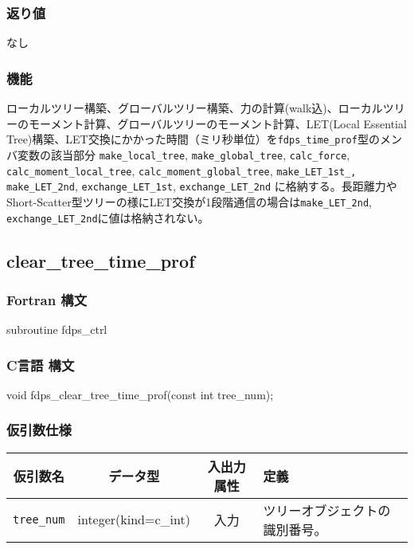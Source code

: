 \subsubsection*{返り値}
なし

\subsubsection*{機能}
ローカルツリー構築、グローバルツリー構築、力の計算(walk込)、ローカルツリーのモーメント計算、グローバルツリーのモーメント計算、LET(Local Essential Tree)構築、LET交換にかかった時間（ミリ秒単位）を\texttt{fdps\_time\_prof}型のメンバ変数の該当部分
\texttt{make\_local\_tree}, 
\texttt{make\_global\_tree},
\texttt{calc\_force},
\texttt{calc\_moment\_local\_tree},
\texttt{calc\_moment\_global\_tree},
\texttt{make\_LET\_1st\_, make\_LET\_2nd},
\texttt{exchange\_LET\_1st},
\texttt{exchange\_LET\_2nd}
に格納する。長距離力やShort-Scatter型ツリーの様にLET交換が1段階通信の場合は\texttt{make\_LET\_2nd}, \texttt{exchange\_LET\_2nd}に値は格納されない。
\clearpage

\subsection{clear\_tree\_time\_prof}
\subsubsection*{Fortran 構文}
\begin{screen}
\begin{spverbatim}
subroutine fdps_ctrl%
\end{spverbatim}
\end{screen}

\subsubsection*{C言語 構文}
\begin{screen}
\begin{spverbatim}
void fdps_clear_tree_time_prof(const int tree_num); 
\end{spverbatim}
\end{screen}

\subsubsection*{仮引数仕様}
\begin{table}[h]
\begin{tabularx}{\linewidth}{cccX}
\toprule
\rowcolor{Snow2}
仮引数名 & データ型 & 入出力属性 & 定義 \\
\midrule
\verb|tree_num|  & integer(kind=c\_int)   & 入力     & ツリーオブジェクトの識別番号。\\
\bottomrule
\end{tabularx}
\end{table}


